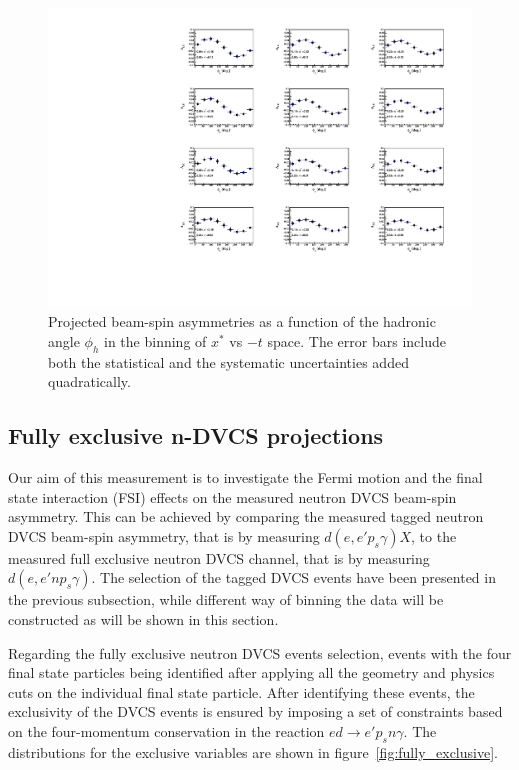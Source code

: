 \begin{figure}[htb]
  \centering
    \includegraphics[width=1.1\textwidth,clip]{figs/pdf/BSA_incoherent_Phi_x_t.pdf}
  \caption{Projected beam-spin asymmetries as a function of the hadronic angle 
   $\phi_h$ in the binning of $x^{*}$ vs $-t$ space. The error bars include 
   both the statistical and the systematic uncertainties added quadratically.
   \label{fig:alu_tagged}}
\end{figure}




\subsection{Fully exclusive n-DVCS projections}
Our aim of this measurement is to investigate the Fermi motion and the final 
state interaction (FSI) effects on the measured neutron DVCS beam-spin 
asymmetry. This can be achieved by comparing the measured tagged neutron DVCS 
beam-spin asymmetry, that is by measuring $d(e,e'p_s\gamma)X$, to the measured 
full exclusive neutron DVCS channel, that is by measuring $d(e,e'np_s\gamma)$.  
The selection of the tagged DVCS events have been presented in the previous 
subsection, while different way of binning the data will be constructed as will 
be shown in this section. 

Regarding the fully exclusive neutron DVCS events selection, events with the 
four final state particles being identified after applying all the geometry and 
physics cuts on the individual final state particle. After identifying these 
events, the exclusivity of the DVCS events is ensured by imposing a set of 
constraints based on the four-momentum conservation in the reaction 
$ed\rightarrow e'p_{s}n\gamma$.  The distributions for the exclusive variables 
are shown in figure~\ref{fig:fully_exclusive}.

